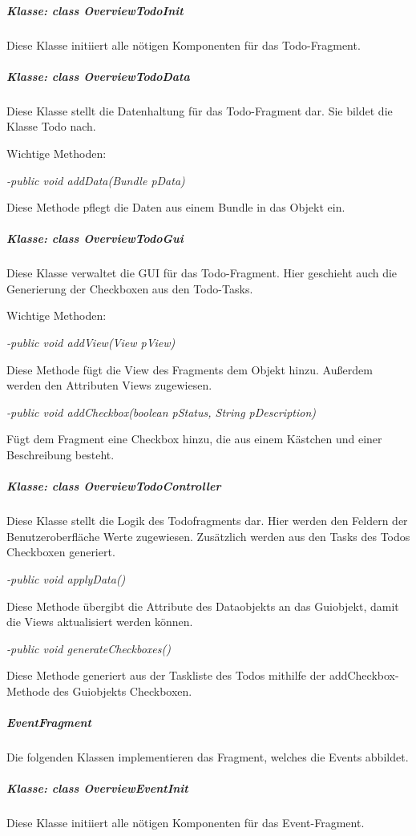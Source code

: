 \subparagraph*{Klasse: class OverviewTodoInit}

Diese Klasse initiiert alle nötigen Komponenten für das Todo-Fragment.

\subparagraph*{Klasse: class OverviewTodoData}

Diese Klasse stellt die Datenhaltung für das Todo-Fragment dar. Sie bildet die Klasse Todo nach.

Wichtige Methoden:

\textit{-public void addData(Bundle pData)}

Diese Methode pflegt die Daten aus einem Bundle in das Objekt ein.

\subparagraph*{Klasse: class OverviewTodoGui}

Diese Klasse verwaltet die GUI für das Todo-Fragment. Hier geschieht auch die Generierung der Checkboxen aus den Todo-Tasks.

Wichtige Methoden:

\textit{-public void addView(View pView)}

Diese Methode fügt die View des Fragments dem Objekt hinzu. Außerdem werden den Attributen Views zugewiesen.

\textit{-public void addCheckbox(boolean pStatus, String pDescription)}

Fügt dem Fragment eine Checkbox hinzu, die aus einem Kästchen und einer Beschreibung besteht.

\subparagraph*{Klasse: class OverviewTodoController}

Diese Klasse stellt die Logik des Todofragments dar. Hier werden den Feldern der Benutzeroberfläche Werte zugewiesen. Zusätzlich werden aus den Tasks des Todos Checkboxen generiert.

\textit{-public void applyData()}

Diese Methode übergibt die Attribute des Dataobjekts an das Guiobjekt, damit die Views aktualisiert werden können.

\textit{-public void generateCheckboxes()}

Diese Methode generiert aus der Taskliste des Todos mithilfe der addCheckbox-Methode des Guiobjekts Checkboxen.

\subparagraph{EventFragment}

Die folgenden Klassen implementieren das Fragment, welches die Events abbildet.

\subparagraph*{Klasse: class OverviewEventInit}

Diese Klasse initiiert alle nötigen Komponenten für das Event-Fragment.

